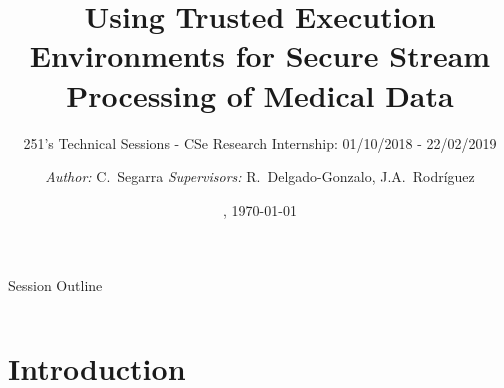 \documentclass[10pt,    %
    english,            %
    xcolor=table,       %
    envcountsect,        %
    aspectratio=169     %
]{beamer}
\title[TEEs for Secure Stream Processing] %
    {Using Trusted Execution Environments for Secure Stream Processing of Medical Data}
\subtitle{251's Technical Sessions - CSe Research Internship: 01/10/2018 - 22/02/2019} %
\date[Thursday, May 30th] %
    {\datedayname, \today}
\author[] %
{\textit{Author:} C.~Segarra\inst{1, 2} \hfill \textit{Supervisors:} R.~Delgado-Gonzalo\inst{1}, J.A.~Rodr\'iguez\inst{2}}
\institute[] %
{\inst{1} Swiss Center for Electronics and Microtechnology (CSEM), Neuch\^atel, Switzerland, \texttt{\{first.last\}@csem.ch} \and
\inst{2} Universitat Polit\`ecnica de Catalunya (UPC), Spain \texttt{\{p.aublin,prp\}@imperial.ac.uk}
}
\begin{document}
\begin{frame}
  \titlepage
\end{frame}

\begin{frame}{Session Outline}
    \begin{columns}[T,onlytextwidth]
        \begin{column}{.48\textwidth}
            \tableofcontents[sections={1-2}]
        \end{column}
        \begin{column}{.48\textwidth}
            \tableofcontents[sections={3-5}]
        \end{column}
    \end{columns}
\end{frame}

\section{Introduction}
\label{sec:introduction}
\sectionframe
\end{document}

